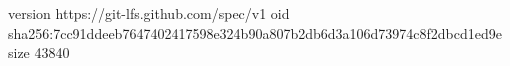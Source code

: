 version https://git-lfs.github.com/spec/v1
oid sha256:7cc91ddeeb7647402417598e324b90a807b2db6d3a106d73974c8f2dbcd1ed9e
size 43840
